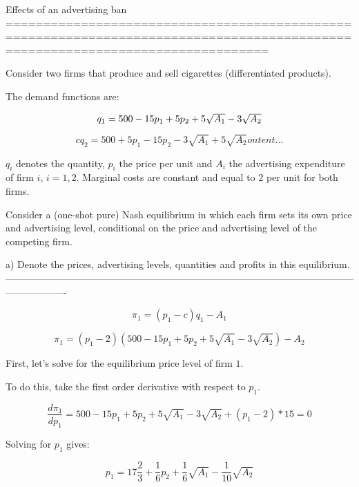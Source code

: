 \documentclass[12pt,english]{article}%
\begin{document}
Effects of an advertising ban
===============================================================================================================================

Consider two firms that produce and sell cigarettes (differentiated products).

The demand functions are:

\begin{equation}
$$q_1=500-15p_1+5p_2+5\sqrt{A_1}-3\sqrt{A_2}$$
\end{equation}

\begin{equation}
cq_2=500+5p_1-15p_2-3\sqrt{A_1}+5\sqrt{A_2}ontent...
\end{equation}

$q_i$ denotes the quantity, $p_i$ the price per unit and $A_i$ the advertising expenditure of firm $i$, $i=1,2$.
Marginal costs are constant and equal to 2 per unit for both firms. 

Consider a (one-shot pure) Nash equilibrium in which each firm sets its own price and advertising level, conditional on the price and advertising level of the competing firm. 

a) Denote the prices, advertising levels, quantities and profits in this equilibrium.
-------------------------------------------------------------------------------------------------------------------------------

\begin{equation}
\pi_1=(p_1-c)q_1-A_1
\end{equation}

\begin{equation}
\pi_1=(p_1-2)(500-15p_1+5p_2+5\sqrt{A_1}-3\sqrt{A_2})-A_2
\end{equation}


First, let's solve for the equilibrium price level of firm $1$.
 
To do this, take the first order derivative with respect to $p_1$.

\begin{equation}
\frac{d\pi_1}{dp_1}=500-15p_1+5p_2+5\sqrt{A_1}-3\sqrt{A_2}+(p_1-2)*15=0
\end{equation}

Solving for $p_1$ gives:

\begin{equation}
p_1=17\frac{2}{3}+\frac{1}{6}p_2+\frac{1}{6}\sqrt{A_1}-\frac{1}{10}\sqrt{A_2}
\end{equation}
\end{document}
